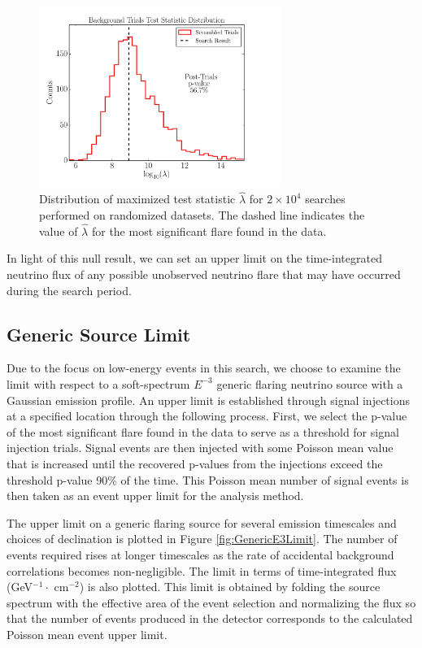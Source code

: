 \documentclass[manuscript]{aastex}
\begin{document}
\begin{figure}[ht]
  \begin{center}
    \includegraphics[width=0.7\textwidth,keepaspectratio]{plots/TestStatisticDistribution_WithResult.pdf}
  \end{center}
  \caption[Background Test Statistic Distribution]{Distribution of maximized test statistic $\hat{\lambda}$ for $2\times 10^4$ searches performed on randomized datasets. The dashed line indicates the value of $\hat{\lambda}$ for the most significant flare found in the data.}
  \label{fig:BkgTSDistribution}
\end{figure}
In light of this null result, we can set an upper limit on the time-integrated neutrino flux of any possible unobserved neutrino flare that may have occurred during the search period.
\subsection{Generic Source Limit}
Due to the focus on low-energy events in this search, we choose to examine the limit with respect to a soft-spectrum $E^{-3}$ generic flaring neutrino source with a Gaussian emission profile. An upper limit is established through signal injections at a specified location through the following process. First, we select the p-value of the most significant flare found in the data to serve as a threshold for signal injection trials. Signal events are then injected with some Poisson mean value that is increased until the recovered p-values from the injections exceed the threshold p-value 90$\%$ of the time. This Poisson mean number of signal events is then taken as an event upper limit for the analysis method.

The upper limit on a generic flaring source for several emission timescales and choices of declination is plotted in Figure \ref{fig:GenericE3Limit}. The number of events required rises at longer timescales as the rate of accidental background correlations becomes non-negligible. The limit in terms of time-integrated flux (GeV$^{-1} \cdot$ cm$^{-2}$) is also plotted. This limit is obtained by folding the source spectrum with the effective area of the event selection and normalizing the flux so that the number of events produced in the detector corresponds to the calculated Poisson mean event upper limit. 
\end{document}
